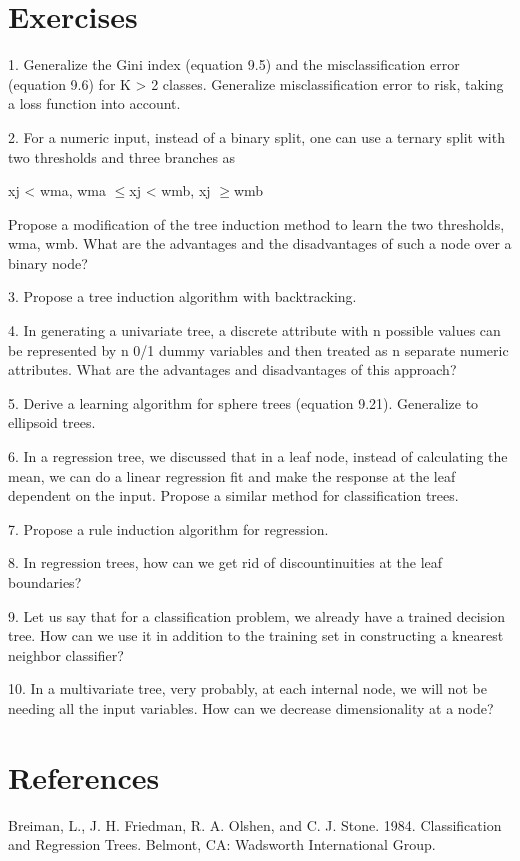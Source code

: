 \section{Exercises}

1. Generalize the Gini index (equation 9.5) and the misclassification error (equation 9.6) for K > 2 classes. Generalize misclassification error to risk, taking a loss function into account.

2. For a numeric input, instead of a binary split, one can use a ternary split with two thresholds and three branches as

xj < wma, wma $\leq$xj < wmb, xj $\geq$wmb

Propose a modification of the tree induction method to learn the two thresholds, wma, wmb. What are the advantages and the disadvantages of such a node over a binary node?

3. Propose a tree induction algorithm with backtracking.

4. In generating a univariate tree, a discrete attribute with n possible values can be represented by n 0/1 dummy variables and then treated as n separate numeric attributes. What are the advantages and disadvantages of this approach?

5. Derive a learning algorithm for sphere trees (equation 9.21). Generalize to ellipsoid trees.

6. In a regression tree, we discussed that in a leaf node, instead of calculating the mean, we can do a linear regression fit and make the response at the leaf dependent on the input. Propose a similar method for classification trees.

7. Propose a rule induction algorithm for regression.

8. In regression trees, how can we get rid of discountinuities at the leaf boundaries?

9. Let us say that for a classification problem, we already have a trained decision tree. How can we use it in addition to the training set in constructing a knearest neighbor classifier?

10. In a multivariate tree, very probably, at each internal node, we will not be needing all the input variables. How can we decrease dimensionality at a node?

\section{References}

Breiman, L., J. H. Friedman, R. A. Olshen, and C. J. Stone. 1984. Classification and Regression Trees. Belmont, CA: Wadsworth International Group.

